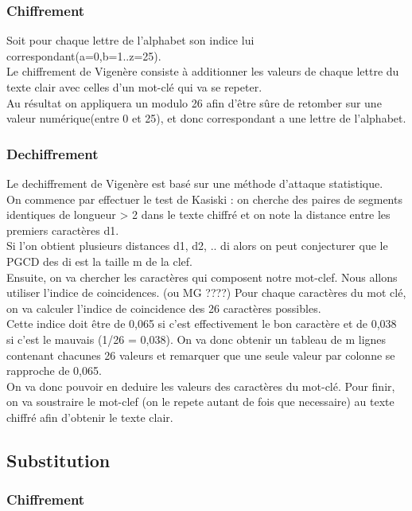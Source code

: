 \documentclass[a4]{article}
\begin{document}
			\subsubsection{Chiffrement}
			
			Soit pour chaque lettre de l'alphabet son indice lui correspondant(a=0,b=1..z=25).\\
			Le chiffrement de Vigenère consiste à additionner les valeurs de chaque lettre du texte
			 clair avec celles d'un mot-clé qui va se repeter.\\
			 Au résultat on appliquera un modulo 26 afin d'être sûre de retomber sur une valeur numérique(entre 0 et 25),
			  et donc correspondant a une lettre de l'alphabet.

			\subsubsection{Dechiffrement}


Le dechiffrement de Vigenère est basé sur une méthode d'attaque statistique.\\
On commence par effectuer le test de Kasiski : on cherche des paires de segments identiques de longueur > 2 dans le texte chiffré et 
on note la distance entre les premiers caractères d1.\\
 Si l'on obtient plusieurs distances d1, d2, .. di alors on peut conjecturer que le PGCD des di est la taille m de la clef.\\
Ensuite, on va chercher les caractères qui composent notre mot-clef. Nous allons utiliser l'indice de coincidences. (ou MG ????)
Pour chaque caractères du mot clé, on va calculer l'indice de coincidence des 26 caractères possibles.\\
Cette indice doit être de 0,065 si c'est effectivement le bon caractère et de 0,038 si c'est le mauvais (1/26 = 0,038).
On va donc obtenir un tableau de m lignes contenant chacunes 26 valeurs et remarquer que une seule valeur par colonne se
rapproche de 0,065.\\
On va donc pouvoir en deduire les valeurs des caractères du mot-clé.
Pour finir, on va soustraire le mot-clef (on le repete autant de fois que necessaire) au texte chiffré afin d'obtenir le texte clair.
		\subsection{Substitution}
		
					\subsubsection{Chiffrement}
\end{document}
